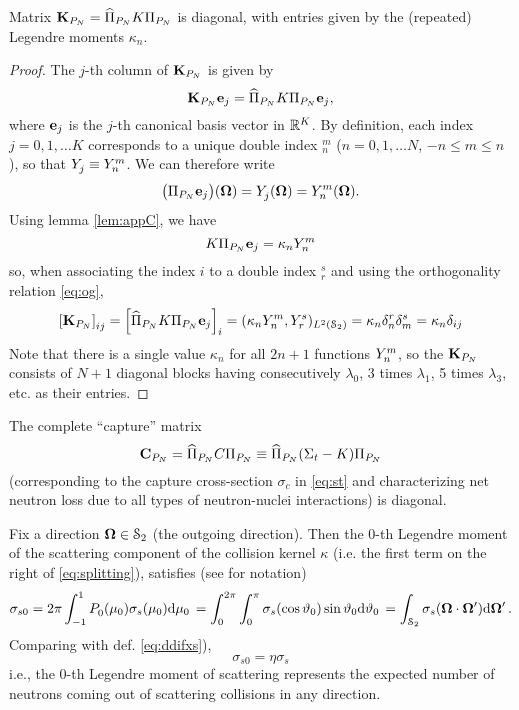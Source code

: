 \begin{corollary}
	Matrix $\mat{K}_{P_N} = \PihPN K \PiPN$ is diagonal, with entries given by the (repeated) Legendre moments $\kappa_n$.
\end{corollary}
\begin{proof}
	The $j$-th column of $\mat{K}_{P_N}$ is given by
	$$
		\mat{K}_{P_N}\mat{e}_j = \PihPN K \PiPN \mat{e}_j,
	$$
	where $\mat{e}_j$ is the $j$-th canonical basis vector in $\R[K]$. By definition, each index \mbox{$j = 0,1,\ldots K$}
	corresponds to a unique double index ${}_n^m$ ($n = 0,1,\ldots N$, $-n \leq m \leq n$), so that $\Y{j}{} \equiv
	\Y{n}{m}$.
	We can therefore write 
	$$
		\bigl(\PiPN \mat{e}_j\bigr)(\bomega) = \Y{j}{}(\bomega) = Y_n^m(\bomega).
	$$
	Using lemma \ref{lem:appC}, we have 
	$$
		K \PiPN \mat{e}_j = \kappa_n \Y{n}{m}
	$$
	so, when associating the index $i$ to a double index ${}_r^s$ and using the orthogonality relation \eqref{eq:og},
	$$
	\left[\mat{K}_{P_N}\right]_{ij} = \left[\PihPN K \PiPN \mat{e}_j\right]_i = (\kappa_n \Y{n}{m},
		\Y{r}{s})_{\Lp[2](\Sphere)} = \kappa_n\delta_{n}^{r}\delta_{m}^{s} = \kappa_n\kron{i}{j}
	$$
	Note that there is a single value $\kappa_n$ for all $2n + 1$ functions  $\Y{n}{m}$, so the $\mat{K}_{P_N}$ consists of
	$N+1$ diagonal blocks having consecutively $\lambda_0$, 3 times $\lambda_1$, 5 times $\lambda_3$, etc.  as their
	entries.
\end{proof}
\begin{corollary}
The complete ``capture'' matrix 
$$
	\mat{C}_{P_N} = \PihPN C \PiPN \equiv \PihPN (\Sigma_t - K) \PiPN 
$$
(corresponding to the capture cross-section $\sigma_c$ in \eqref{eq:st} and characterizing net neutron loss due to
all types of neutron-nuclei interactions) is diagonal.
\end{corollary}
\vspace*{1em}
\begin{remark}\label{rem:app:c}
	Fix a direction $\bomega\in\Sphere$ (the outgoing direction). Then the $0$-th Legendre moment of the scattering
	component of the collision kernel $\kappa$ (i.e. the first term on the right of \eqref{eq:splitting}), satisfies (see
	 for notation) 
	$$
		\sigma_{s0} = 2\pi \muint[_0]{\P{0}{}(\mu_0)\sigma_s(\mu_0)} = \int_{0}^{2\pi} \int_{0}^{\pi}
		\sigma_s(\cos \polar_0) \sin \polar_0\d{\polar_0} = 
		\int_{\Sphere} \sigma_s(\bomega\cdot\bomega') \d{\bomega'}.
	$$
	Comparing with def. \eqref{eq:ddifxs}), 
	$$
		\sigma_{s0} = \eta\sigma_s
	$$
	i.e., the $0$-th Legendre moment of scattering represents the expected number of neutrons coming out of 
	scattering collisions in any direction.
\end{remark}
\newpage
